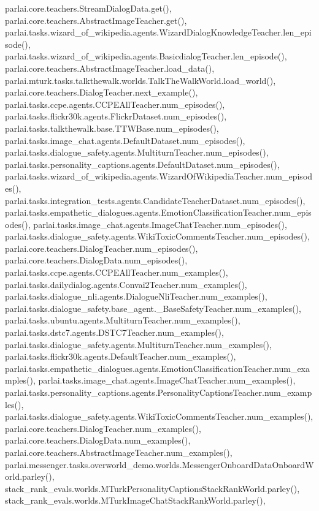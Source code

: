 parlai.\+core.\+teachers.\+Stream\+Dialog\+Data.\+get(), parlai.\+core.\+teachers.\+Abstract\+Image\+Teacher.\+get(), parlai.\+tasks.\+wizard\+\_\+of\+\_\+wikipedia.\+agents.\+Wizard\+Dialog\+Knowledge\+Teacher.\+len\+\_\+episode(), parlai.\+tasks.\+wizard\+\_\+of\+\_\+wikipedia.\+agents.\+Basicdialog\+Teacher.\+len\+\_\+episode(), parlai.\+core.\+teachers.\+Abstract\+Image\+Teacher.\+load\+\_\+data(), parlai.\+mturk.\+tasks.\+talkthewalk.\+worlds.\+Talk\+The\+Walk\+World.\+load\+\_\+world(), parlai.\+core.\+teachers.\+Dialog\+Teacher.\+next\+\_\+example(), parlai.\+tasks.\+ccpe.\+agents.\+C\+C\+P\+E\+All\+Teacher.\+num\+\_\+episodes(), parlai.\+tasks.\+flickr30k.\+agents.\+Flickr\+Dataset.\+num\+\_\+episodes(), parlai.\+tasks.\+talkthewalk.\+base.\+T\+T\+W\+Base.\+num\+\_\+episodes(), parlai.\+tasks.\+image\+\_\+chat.\+agents.\+Default\+Dataset.\+num\+\_\+episodes(), parlai.\+tasks.\+dialogue\+\_\+safety.\+agents.\+Multiturn\+Teacher.\+num\+\_\+episodes(), parlai.\+tasks.\+personality\+\_\+captions.\+agents.\+Default\+Dataset.\+num\+\_\+episodes(), parlai.\+tasks.\+wizard\+\_\+of\+\_\+wikipedia.\+agents.\+Wizard\+Of\+Wikipedia\+Teacher.\+num\+\_\+episodes(), parlai.\+tasks.\+integration\+\_\+tests.\+agents.\+Candidate\+Teacher\+Dataset.\+num\+\_\+episodes(), parlai.\+tasks.\+empathetic\+\_\+dialogues.\+agents.\+Emotion\+Classification\+Teacher.\+num\+\_\+episodes(), parlai.\+tasks.\+image\+\_\+chat.\+agents.\+Image\+Chat\+Teacher.\+num\+\_\+episodes(), parlai.\+tasks.\+dialogue\+\_\+safety.\+agents.\+Wiki\+Toxic\+Comments\+Teacher.\+num\+\_\+episodes(), parlai.\+core.\+teachers.\+Dialog\+Teacher.\+num\+\_\+episodes(), parlai.\+core.\+teachers.\+Dialog\+Data.\+num\+\_\+episodes(), parlai.\+tasks.\+ccpe.\+agents.\+C\+C\+P\+E\+All\+Teacher.\+num\+\_\+examples(), parlai.\+tasks.\+dailydialog.\+agents.\+Convai2\+Teacher.\+num\+\_\+examples(), parlai.\+tasks.\+dialogue\+\_\+nli.\+agents.\+Dialogue\+Nli\+Teacher.\+num\+\_\+examples(), parlai.\+tasks.\+dialogue\+\_\+safety.\+base\+\_\+agent.\+\_\+\+Base\+Safety\+Teacher.\+num\+\_\+examples(), parlai.\+tasks.\+ubuntu.\+agents.\+Multiturn\+Teacher.\+num\+\_\+examples(), parlai.\+tasks.\+dstc7.\+agents.\+D\+S\+T\+C7\+Teacher.\+num\+\_\+examples(), parlai.\+tasks.\+dialogue\+\_\+safety.\+agents.\+Multiturn\+Teacher.\+num\+\_\+examples(), parlai.\+tasks.\+flickr30k.\+agents.\+Default\+Teacher.\+num\+\_\+examples(), parlai.\+tasks.\+empathetic\+\_\+dialogues.\+agents.\+Emotion\+Classification\+Teacher.\+num\+\_\+examples(), parlai.\+tasks.\+image\+\_\+chat.\+agents.\+Image\+Chat\+Teacher.\+num\+\_\+examples(), parlai.\+tasks.\+personality\+\_\+captions.\+agents.\+Personality\+Captions\+Teacher.\+num\+\_\+examples(), parlai.\+tasks.\+dialogue\+\_\+safety.\+agents.\+Wiki\+Toxic\+Comments\+Teacher.\+num\+\_\+examples(), parlai.\+core.\+teachers.\+Dialog\+Teacher.\+num\+\_\+examples(), parlai.\+core.\+teachers.\+Dialog\+Data.\+num\+\_\+examples(), parlai.\+core.\+teachers.\+Abstract\+Image\+Teacher.\+num\+\_\+examples(), parlai.\+messenger.\+tasks.\+overworld\+\_\+demo.\+worlds.\+Messenger\+Onboard\+Data\+Onboard\+World.\+parley(), stack\+\_\+rank\+\_\+evals.\+worlds.\+M\+Turk\+Personality\+Captions\+Stack\+Rank\+World.\+parley(), stack\+\_\+rank\+\_\+evals.\+worlds.\+M\+Turk\+Image\+Chat\+Stack\+Rank\+World.\+parley(), 